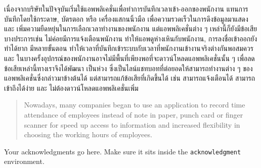 \maketitle
\makesignature

\ifproject
\begin{abstractTH}

เนื่องจากบริษัทในปัจจุบันเริ่มใช้แอพพลิเคชั่นเพื่อทำการบันทึกเวลาเข้า-ออกของพนักงาน แทนการบันทึกโดยใช้กระดาษ, บัตรตอก หรือ เครื่องแสกนนิ้วมือ
\enskip เพื่อความรวดเร็วในการดึงข้อมูลมาแสดง และ เพิ่มความยืดหยุ่นในการเลือกเวลาทำงานของพนักงาน
\enskip แต่แอพพลิเคชั่นต่าง ๆ เหล่านี้ก็ยังมีข้อเสียบางประการเช่น ไม่ค่อยมีการแจ้งเตือนพนักงาน ทำให้แอพดูห่างเหินกับพนักงาน, 
การลงชื่อเข้าออกยังทำได้ยาก มีหลายขั้นตอน ทำให้เวลาที่บันทึกเข้าระบบกับเวลาที่พนักงานเข้างานจริงต่างกันพอสมควร 
และ ในบางครั้งอุปกรณ์ของพนักงานอาจไม่มีพื้นที่เพียงพอที่จะดาวน์โหลดแอพพลิเคชั่นนั้น ๆ
\enskip เพื่อลดข้อเสียเหล่านี้ทางเราจึงได้พัฒนา เป็นห่วง ซึ่งเป็นไลน์แชทบอทที่ต่อยอดให้สามารถทำงานต่าง ๆ ของแอพพลิเคชั่นซึ่งกล่าวมาข้างต้นได้
แต่สามารถแก้ข้อเสียที่เกิดขึ้นได้ เช่น สามารถแจ้งเตือนได้ สามารถเข้าถึงได้ง่าย และ ไม่ต้องดาวน์โหลดแอพพลิเคชั่นเพิ่ม
\end{abstractTH}


\begin{abstract}
Nowadays, many companies began to use an application to record time attendance of employees instead of note in paper, punch card or finger scanner 
for speed up access to information and increased flexibility in choosing the working hours of employees.
\end{abstract}

\iffalse
\begin{dedication}
This document is dedicated to all Chiang Mai University students.

Dedication page is optional.
\end{dedication}
\fi %

\begin{acknowledgments}
Your acknowledgments go here. Make sure it sits inside the
\texttt{acknowledgment} environment.

\end{acknowledgments}%
\fi %

\contentspage

\ifproject
\figurelistpage

\tablelistpage
\fi %



